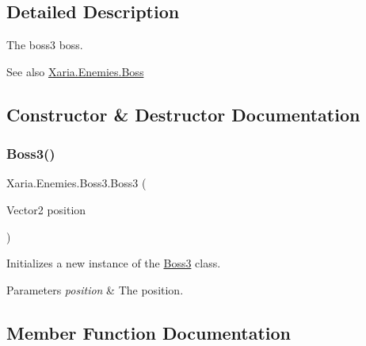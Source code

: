 \subsection{Detailed Description}
The boss3 boss. 

\begin{DoxySeeAlso}{See also}
\hyperlink{classXaria_1_1Enemies_1_1Boss}{Xaria.\+Enemies.\+Boss}


\end{DoxySeeAlso}


\subsection{Constructor \& Destructor Documentation}
\mbox{\label{classXaria_1_1Enemies_1_1Boss3_ab3df4922a9d053c102ebcd31dded6b87}} 
\subsubsection{\texorpdfstring{Boss3()}{Boss3()}}
{\footnotesize\ttfamily Xaria.\+Enemies.\+Boss3.\+Boss3 (\begin{DoxyParamCaption}\item[{Vector2}]{position }\end{DoxyParamCaption})\hspace{0.3cm}{\ttfamily [inline]}}



Initializes a new instance of the \hyperlink{classXaria_1_1Enemies_1_1Boss3}{Boss3} class. 


\begin{DoxyParams}{Parameters}
{\em position} & The position.\\
\hline
\end{DoxyParams}


\subsection{Member Function Documentation}
\mbox{\label{classXaria_1_1Enemies_1_1Boss3_a5dfe4d674dc5bf5b39b0625ed89b1eb5}} 
